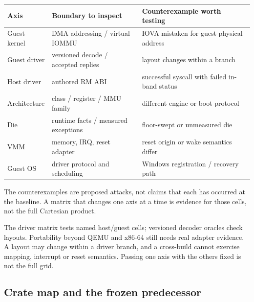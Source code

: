 \begin{center}\small
\begin{tabularx}{\textwidth}{@{}lXX@{}}
\toprule Axis & Boundary to inspect & Counterexample worth testing \\
\midrule
Guest kernel & DMA addressing / virtual IOMMU & IOVA mistaken for guest physical address \\
Guest driver & versioned decode / accepted replies & layout changes within a branch \\
Host driver & authored RM ABI & successful syscall with failed in-band status \\
Architecture & class / register / MMU family & different engine or boot protocol \\
Die & runtime facts / measured exceptions & floor-swept or unmeasured die \\
VMM & memory, IRQ, reset adapter & reset origin or wake semantics differ \\
Guest OS & driver protocol and scheduling & Windows registration / recovery path \\
\bottomrule
\end{tabularx}
\end{center}
The counterexamples are proposed attacks, not claims that each has occurred at the baseline.
A matrix that changes one axis at a time is evidence for those cells, not the full Cartesian
product.

{The driver matrix tests named host/guest cells; versioned decoder oracles check layouts.
Portability beyond QEMU and x86-64 still needs real adapter evidence.
}
{A layout may change within a driver branch, and a cross-build cannot exercise mapping,
interrupt or reset semantics. Passing one axis with the others fixed is not the full grid.}

\subsection{Crate map and the frozen predecessor}

